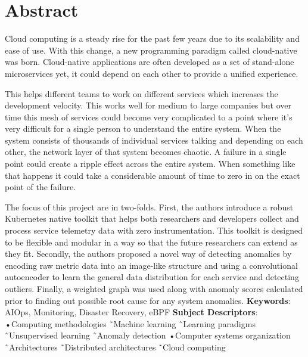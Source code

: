 \chapter*{Abstract}


Cloud computing is a steady rise for the past few years due to its scalability and ease of use. With this change, a new programming paradigm called cloud-native was born. Cloud-native applications are often developed as a set of stand-alone microservices yet, it could depend on each other to provide a unified experience. 

This helps different teams to work on different services which increases the development velocity. This works well for medium to large companies but over time this mesh of services could become very complicated to a point where it's very difficult for a single person to understand the entire system. When the system consists of thousands of individual services talking and depending on each other, the network layer of that system becomes chaotic. A failure in a single point could create a ripple effect across the entire system. When something like that happens it could take a considerable amount of time to zero in on the exact point of the failure.

The focus of this project are in two-folds. First, the authors introduce a robust Kubernetes native toolkit that helps both researchers and developers collect and process service telemetry data with zero instrumentation. This toolkit is designed to be flexible and modular in a way so that the future researchers can extend as they fit. Secondly, the authors proposed a novel way of detecting anomalies by encoding raw metric data into an image-like structure and using a convolutional autoencoder to learn the general data distribution for each service and detecting outliers. Finally, a weighted graph was used along with anomaly scores calculated prior to finding out possible root cause for any system anomalies.
\newline
\newline
\textbf{Keywords}:
AIOps, Monitoring, Disaster Recovery, eBPF
\newline
\textbf{Subject Descriptors}:
•Computing methodologies \~\ Machine learning \~\ Learning paradigms \~\ Unsupervised learning \~\ Anomaly detection •Computer systems organization \~\ Architectures \~\ Distributed architectures \~\ Cloud computing